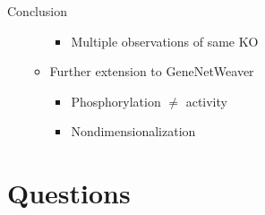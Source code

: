\begin{frame}{Conclusion}
\begin{itemize}
\begin{itemize}
\begin{itemize}
            \item Multiple observations of same KO
        \end{itemize}
    \item Further extension to GeneNetWeaver
    \begin{itemize}
        \item Phosphorylation $\ne$ activity
        \item Nondimensionalization
    \end{itemize}
\end{itemize}
\end{itemize}
\end{frame}

% 


\section*{Questions}

